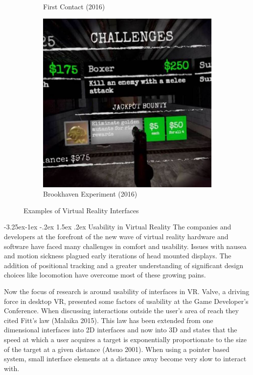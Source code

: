\documentclass[12pt]{article}
\makeatletter
\renewcommand{\subsection}{\@startsection{subsection}{2}{\z@}%
             {-3.25ex\@plus -1ex \@minus -.2ex}%
             {1.5ex \@plus .2ex}%
             {\normalfont\large\scshape\bfseries}}
\makeatother
\begin{document}
\begin{figure}
\begin{subfigure}{.33\textwidth}
  \caption{First Contact (2016)}
\end{subfigure}%
\begin{subfigure}{.33\textwidth}
  \centering
  \includegraphics[width=.95\linewidth]{brookhaven.jpg}
  \caption{Brookhaven Experiment (2016)}
\end{subfigure}
\caption{Examples of Virtual Reality Interfaces}
\end{figure}

\subsection{Usability in Virtual Reality}
The companies and developers at the forefront of the new wave of virtual reality hardware and software have faced many challenges in comfort and usability. Issues with nausea and motion sickness plagued early iterations of head mounted displays. The addition of positional tracking and a greater understanding of significant design choices like locomotion have overcome most of these growing pains.

Now the focus of research is around usability of interfaces in VR. Valve, a driving force in desktop VR, presented some factors of usability at the Game Developer's Conference. When discussing interactions outside the user's area of reach they cited Fitt's law (Malaika 2015). This law has been extended from one dimensional interfaces into 2D interfaces and now into 3D and states that the speed at which a user acquires a target is exponentially proportionate to the size of the target at a given distance (Atsuo 2001). When using a pointer based system, small interface elements at a distance away become very slow to interact with. 
\end{document}

